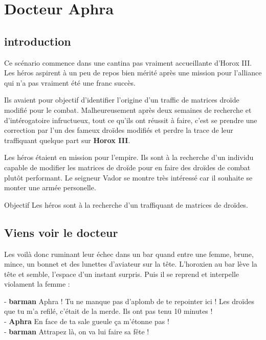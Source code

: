 \section{Docteur Aphra}

\subsection{introduction}
Ce scénario commence dans une cantina pas vraiment accueillante d’Horox III. Les héros aspirent à un peu de repos bien mérité après une mission pour l’alliance qui n’a pas vraiment été une franc succès.

\lettrine{\jedifont{\$}} Ils avaient pour objectif d’identifier l’origine d’un traffic de matrices droïde modifié pour le combat. Malheureusement après deux semaines de recherche et d’intérogatoire infructueux, tout ce qu’ils ont réussit à faire, c’est se prendre une correction par l’un des fameux droïdes modifiés et perdre la trace de leur traffiquant quelque part sur \textbf{Horox III}. 

\lettrine{\jedifont{\#}} Les héros étaient en mission pour l’empire. Ils sont à la recherche d’un individu capable de modifier les matrices de droïde pour en faire des droïdes de combat plutôt performant. Le seigneur Vador se montre très intéressé car il souhaite se monter une armée personelle.

\begin{paperbox}{Objectif}
Les héros sont à la recherche d’un traffiquant de matrices de droïdes.
\end{paperbox}

\subsection{Viens voir le docteur}
Les voilà donc ruminant leur échec dans un bar quand entre une femme, brune, mince, un bonnet et des lunettes d’aviateur sur la tête. L’horoxien au bar lève la tête et semble, l’espace d’un instant surpris. Puis il se reprend et interpelle violament la femme :

\begin{quotebox}
- \textbf{barman} Aphra ! Tu ne manque pas d’aplomb de te repointer ici ! Les droïdes que tu m’a refilé, c’était de la merde. Ils ont pas tenu 10 minutes !\\
- \textbf{Aphra} En face de ta sale gueule ça m’étonne pas !\\
- \textbf{barman} Attrapez là, on va lui faire sa fête !
\end{quotebox}

